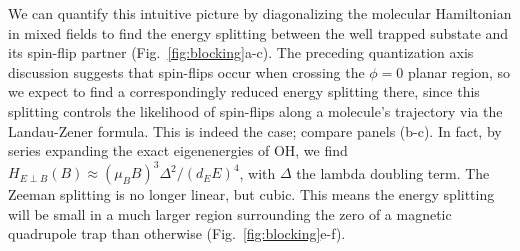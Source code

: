 \documentclass[%
 reprint,
 amsmath,amssymb,
 aps,
prl,
]{revtex4-1}
\newcommand{\epbm}{{E\!\perp\!B}}
\begin{document}
We can quantify this intuitive picture by diagonalizing the molecular Hamiltonian in mixed fields to find the energy splitting between the well trapped substate and its spin-flip partner (Fig.~\ref{fig:blocking}a-c). The preceding quantization axis discussion suggests that spin-flips occur when crossing the $\phi=0$ planar region, so we expect to find a correspondingly reduced energy splitting there, since this splitting controls the likelihood of spin-flips along a molecule's trajectory via the Landau-Zener formula. This is indeed the case; compare panels (b-c). In fact, by series expanding the exact eigenenergies of OH, we find $H_\epbm(B)\approx (\mu_BB)^3\Delta^2/(d_EE)^4$, with $\Delta$ the lambda doubling term. The Zeeman splitting is no longer linear, but cubic. This means the energy splitting will be small in a much larger region surrounding the zero of a magnetic quadrupole trap than otherwise (Fig.~\ref{fig:blocking}e-f).

\end{document}
